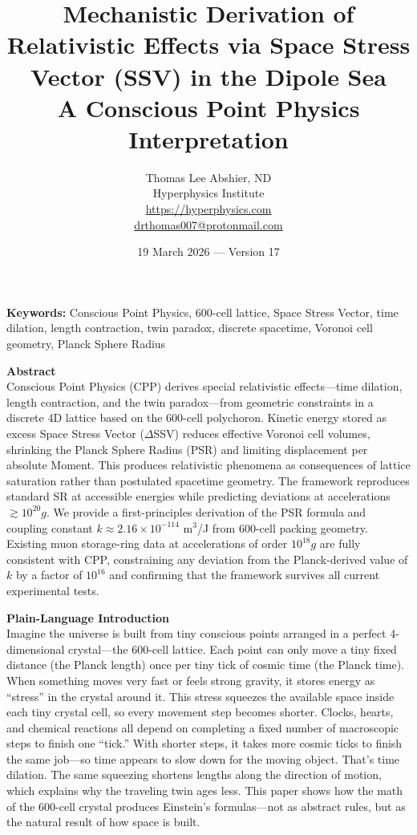 \documentclass[11pt,letterpaper]{article}
\title{\textbf{Mechanistic Derivation of Relativistic Effects via Space Stress Vector (SSV) in the Dipole Sea} \\[0.5em]
\large A Conscious Point Physics Interpretation}
\author{Thomas Lee Abshier, ND\\
Hyperphysics Institute \\
\url{https://hyperphysics.com} \\
\href{mailto:drthomas007@protonmail.com}{drthomas007@protonmail.com}}
\date{19 March 2026 --- Version 17}
\begin{document}
\maketitle

\noindent\textbf{Keywords:} Conscious Point Physics, 600-cell lattice, Space Stress Vector, time dilation, length contraction, twin paradox, discrete spacetime, Voronoi cell geometry, Planck Sphere Radius

\bigskip

\noindent\textbf{Abstract}\\
Conscious Point Physics (CPP) derives special relativistic effects---time dilation, length contraction, and the twin paradox---from geometric constraints in a discrete 4D lattice based on the 600-cell polychoron. Kinetic energy stored as excess Space Stress Vector ($\Delta$SSV) reduces effective Voronoi cell volumes, shrinking the Planck Sphere Radius (PSR) and limiting displacement per absolute Moment. This produces relativistic phenomena as consequences of lattice saturation rather than postulated spacetime geometry. The framework reproduces standard SR at accessible energies while predicting deviations at accelerations $\gtrsim 10^{20}g$. We provide a first-principles derivation of the PSR formula and coupling constant $k \approx 2.16 \times 10^{-114}$ m$^3$/J from 600-cell packing geometry. Existing muon storage-ring data at accelerations of order $10^{18}g$ are fully consistent with CPP, constraining any deviation from the Planck-derived value of $k$ by a factor of $10^{16}$ and confirming that the framework survives all current experimental tests.

\bigskip

\noindent\textbf{Plain-Language Introduction}\\
Imagine the universe is built from tiny conscious points arranged in a perfect 4-dimensional crystal---the 600-cell lattice. Each point can only move a tiny fixed distance (the Planck length) once per tiny tick of cosmic time (the Planck time). When something moves very fast or feels strong gravity, it stores energy as ``stress'' in the crystal around it. This stress squeezes the available space inside each tiny crystal cell, so every movement step becomes shorter. Clocks, hearts, and chemical reactions all depend on completing a fixed number of macroscopic steps to finish one ``tick.'' With shorter steps, it takes more cosmic ticks to finish the same job---so time appears to slow down for the moving object. That's time dilation. The same squeezing shortens lengths along the direction of motion, which explains why the traveling twin ages less. This paper shows how the math of the 600-cell crystal produces Einstein's formulas---not as abstract rules, but as the natural result of how space is built.
\end{document}
